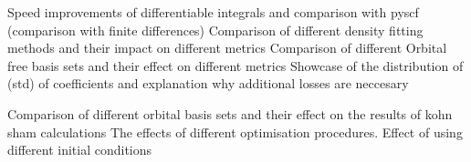 Speed improvements of differentiable integrals and comparison with pyscf (comparison with finite differences)
Comparison of different density fitting methods and their impact on different metrics 
Comparison of different Orbital free basis sets and their effect on different metrics
Showcase of the distribution of (std) of coefficients and explanation why additional losses are neccesary

Comparison of different orbital basis sets and their effect on the results of kohn sham calculations The effects of different optimisation procedures. Effect of using different initial conditions 
